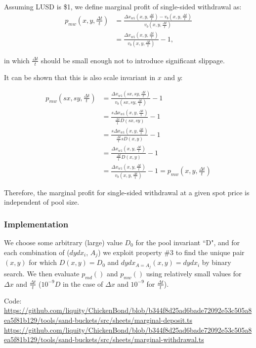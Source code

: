 \documentclass{article}
\begin{document}
Assuming LUSD is \$1, we define marginal profit of single-sided withdrawal as:
\[
\begin{split}
  p_{mw}(x, y, \tfrac{\Delta{t}}{t}) &= \frac{\Delta{x}_{w1}(x, y, \tfrac{\Delta{t}}{t}) - v_b(x, y, \tfrac{\Delta{t}}{t})}{v_b(x, y, \tfrac{\Delta{t}}{t})} \\
  &= \frac{\Delta{x}_{w1}(x, y, \tfrac{\Delta{t}}{t})}{v_b(x, y, \tfrac{\Delta{t}}{t})} - 1,
\end{split}
\]

in which $\tfrac{\Delta{t}}{t}$ should be small enough not to introduce significant slippage.

It can be shown that this is also scale invariant in $x$ and $y$:

\[
\begin{split}
p_{mw}(sx, sy, \tfrac{\Delta{t}}{t}) &= \frac{\Delta{x}_{w1}(sx, sy, \tfrac{\Delta{t}}{t})}{v_b(sx, sy, \tfrac{\Delta{t}}{t})} - 1 \\
  &= \frac{s\Delta{x}_{w1}(x, y, \tfrac{\Delta{t}}{t})}{\tfrac{\Delta{t}}{t} D(sx, sy)} - 1 \\
  &= \frac{s\Delta{x}_{w1}(x, y, \tfrac{\Delta{t}}{t})}{\tfrac{\Delta{t}}{t} sD(x, y)} - 1 \\
  &= \frac{\Delta{x}_{w1}(x, y, \tfrac{\Delta{t}}{t})}{\tfrac{\Delta{t}}{t} D(x, y)} - 1 \\
  &= \frac{\Delta{x}_{w1}(x, y, \tfrac{\Delta{t}}{t})}{v_b(x, y, \tfrac{\Delta{t}}{t})} - 1 = p_{mw}(x, y, \tfrac{\Delta{t}}{t})
\end{split}
\]

Therefore, the marginal profit for single-sided withdrawal at a given spot price is independent of pool size.

\subsubsection{Implementation}

We choose some arbitrary (large) value $D_0$ for the pool invariant ``D", and for each combination of ($dydx_i$, $A_j$) we exploit property \#3 to find the unique pair $(x,y)$ for which $D(x,y)=D_0$ and $dydx_{A=A_j}(x,y)=dydx_i$ by binary search. We then evaluate $p_{md}()$ and $p_{mw}()$ using relatively small values for $\Delta{x}$ and $\tfrac{\Delta{t}}{t}$ ($10^{-9}D$ in the case of $\Delta{x}$ and $10^{-9}$ for $\tfrac{\Delta{t}}{t}$).

Code:
\url{https://github.com/liquity/ChickenBond/blob/b344f8d25ad6bade72092e53c505a8ea5f81b129/tools/sand-buckets/src/sheets/marginal-deposit.ts}
\url{https://github.com/liquity/ChickenBond/blob/b344f8d25ad6bade72092e53c505a8ea5f81b129/tools/sand-buckets/src/sheets/marginal-withdrawal.ts}
\end{document}
